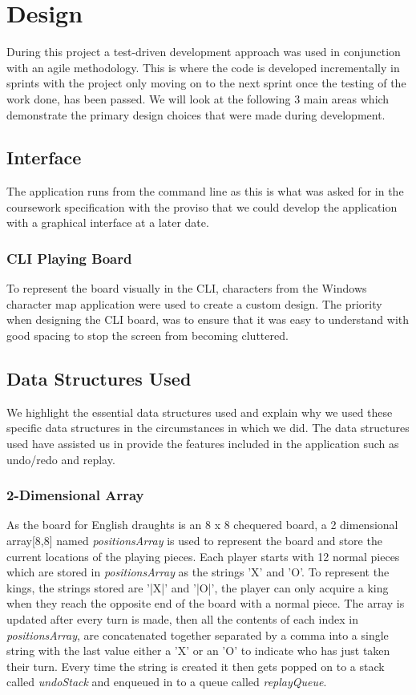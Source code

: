 \documentclass[10pt, a4paper]{article}
\begin{document}
 
    
\section{Design}   
During this project a test-driven development approach was used in conjunction with an agile methodology. This is where the code is developed incrementally in sprints with the project only moving on to the next sprint once the testing of the work done, has been passed. We will look at the following 3 main areas which demonstrate the primary design choices that were made during development.
    
        
    \subsection{Interface}
    The application runs from the command line as this is what was asked for in the coursework specification with the proviso that we could develop the application with a graphical interface at a later date.
    
    
    	\subsubsection{CLI Playing Board}
    	To represent the board visually in the CLI, characters from the Windows character map application were used to create a custom design. The priority when designing the CLI board, was to ensure that it was easy to understand with good spacing to stop the screen from becoming cluttered.
    
    
     
    
    \subsection{Data Structures Used}
    We highlight the essential data structures used and explain why we used these specific data structures in the circumstances in which we did. The data structures used have assisted us in provide the features included in the application such as undo/redo and replay.     
     
    
   		\subsubsection{2-Dimensional Array}   
   		As the board for English draughts is an 8 x 8 chequered board, a 2 dimensional array[8,8] named \textit{positionsArray} is used to represent the board and store the current locations of the playing pieces. Each player starts with 12 normal pieces which are stored in \textit{positionsArray} as the strings 'X' and 'O'. To represent the kings, the strings stored are '|X|' and '|O|', the player can only acquire a king when they reach the opposite end of the board with a normal piece.
   		The array is updated after every turn is made, then all the contents of each index in \textit{positionsArray}, are concatenated together separated by a comma into a single string with the last value either a 'X' or an 'O' to indicate who has just taken their turn. Every time the string is created it then gets popped on to a stack called \textit{undoStack} and enqueued in to a queue called \textit{replayQueue}.
   
\end{document}
